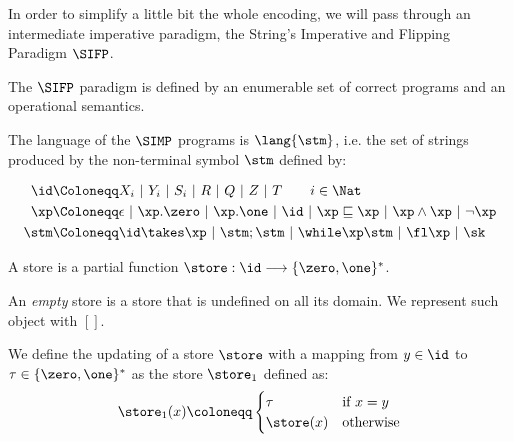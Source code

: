 In order to simplify a little bit the whole encoding, we will pass through an intermediate imperative paradigm, the String's Imperative and Flipping Paradigm $\SIFP$.

The $\SIFP$ paradigm is defined by an enumerable set of correct programs and an operational semantics.


\begin{defn}
The language of the $\SIMP$ programs is $\lang{\stm}$, i.e. the set of strings produced by the non-terminal symbol $\stm$ defined by:

\begin{align*}
\id &\Coloneqq X_i\ |\ Y_i\ |\ S_i\ |\ R\ |\ Q\ |\ Z\ |\ T\qquad i \in \Nat\\
\xp &\Coloneqq \epsilon\ |\ \xp.\zero\ |\ \xp.\one\ |\ \id\ |\ \xp \sqsubseteq \xp\ |\ \xp \land \xp\ |\ \lnot \xp\\
\stm & \Coloneqq \id \takes \xp\ |\ \stm;\stm\ |\ \while \xp \stm\ |\ \fl \xp\ |\ \sk
\end{align*}
\end{defn}

\begin{defn}[Store]
A store is a partial function $\store: \id \longrightarrow \{\zero, \one\}^*$.
\end{defn}

\begin{defn}
An \emph{empty} store is a store that is undefined on all its domain. We represent such object with $[]$.
\end{defn}

\begin{defn}
We define the updating of a store $\store$ with a mapping from $y \in \id$ to $\tau \in \{\zero, \one\}^*$ as the store $\store_1$ defined as:
\[
\store_1(x) \coloneqq \begin{cases} \tau & \text{if } x = y\\ \store(x) & \text{otherwise}\end{cases}
\]
\end{defn}


